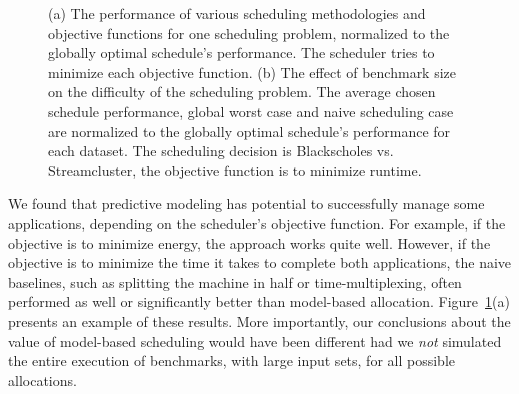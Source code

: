 \begin{figure}[htb]
	\noindent{}
        \caption{\label{fig:case_study_outcome}  (a) The performance
          of various scheduling methodologies and objective functions
          for one scheduling problem, normalized to the globally
          optimal schedule's performance.  The scheduler tries to
          minimize each objective function.  (b) The effect of
          benchmark size on the difficulty of the scheduling problem.
          The average chosen schedule performance, global worst case
          and naive scheduling case are normalized to the globally
          optimal schedule's performance for each dataset. The
          scheduling decision is Blackscholes vs. Streamcluster, the
          objective function is to minimize runtime.
 }
\end{figure}

We found that predictive modeling has potential to successfully manage
some applications, depending on the scheduler's objective function.
For example, if the objective is to minimize energy, the approach
works quite well.  However, if the objective is to minimize the time
it takes to complete both applications, the naive baselines, such as
splitting the machine in half or time-multiplexing, often performed as
well or significantly better than model-based
allocation. Figure~\ref{fig:case_study_outcome}(a) presents an example
of these results. More importantly, our conclusions about the value of
model-based scheduling would have been different had we \emph{not}
simulated the entire execution of benchmarks, with large input sets,
for all possible allocations.

